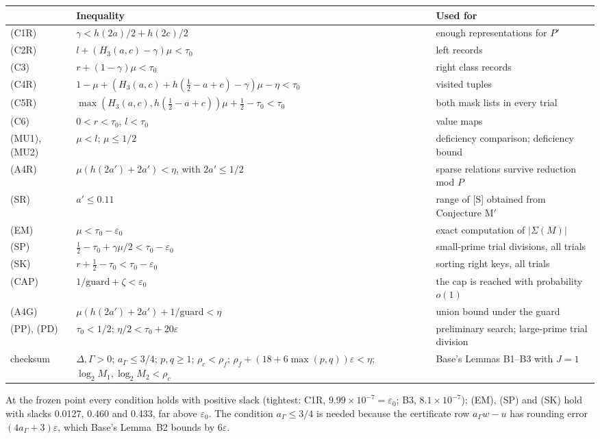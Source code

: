 \documentclass[11pt]{article}
\newcommand{\eps}{\varepsilon}
\theoremstyle{plain}
\begin{document}
\begin{center}
\small
\begin{tabularx}{\linewidth}{>{\raggedright\arraybackslash}p{1.4cm} L >{\raggedright\arraybackslash}p{4.4cm}}
\toprule
& Inequality & Used for \\
\midrule
(C1R) & $\gamma < h(2a)/2 + h(2c)/2$ & enough representations for $P'$ \\
(C2R) & $l + (H_3(a,c) - \gamma)\mu < \tau_0$ & left records \\
(C3) & $r + (1-\gamma)\mu < \tau_0$ & right class records \\
(C4R) & $1 - \mu + (H_3(a,c) + h(\tfrac12 - a + c) - \gamma)\mu - \eta < \tau_0$ & visited tuples \\
(C5R) & $\max(H_3(a,c), h(\tfrac12 - a + c))\mu + \tfrac12 - \tau_0 < \tau_0$ & both mask lists in every trial \\
(C6) & $0 < r < \tau_0$, $l < \tau_0$ & value maps \\
(MU1), (MU2) & $\mu < l$; $\mu \le 1/2$ & deficiency comparison; deficiency bound \\
(A4R) & $\mu(h(2a') + 2a') < \eta$, with $2a' \le 1/2$ & sparse relations survive reduction mod $P$ \\
(SR) & $a' \le 0.11$ & range of [S] obtained from Conjecture M$'$ \\
(EM) & $\mu < \tau_0 - \eps_0$ & exact computation of $|\Sigma(M)|$ \\
(SP) & $\tfrac12 - \tau_0 + \gamma\mu/2 < \tau_0 - \eps_0$ & small-prime trial divisions, all trials \\
(SK) & $r + \tfrac12 - \tau_0 < \tau_0 - \eps_0$ & sorting right keys, all trials \\
(CAP) & $1/\mathrm{guard} + \zeta < \eps_0$ & the cap is reached with probability $o(1)$ \\
(A4G) & $\mu(h(2a') + 2a') + 1/\mathrm{guard} < \eta$ & union bound under the guard \\
(PP), (PD) & $\tau_0 < 1/2$; $\eta/2 < \tau_0 + 20\eps$ & preliminary search; large-prime trial division \\
checksum & $\Delta, \Gamma > 0$; $a_\Gamma \le 3/4$; $p, q \ge 1$; $\rho_c < \rho_f$; $\rho_f + (18 + 6\max(p,q))\eps < \eta$; $\log_2 M_1, \log_2 M_2 < \rho_c$ & Base's Lemmas B1--B3 with $J = 1$ \\
\bottomrule
\end{tabularx}
\end{center}

At the frozen point every condition holds with positive slack (tightest: C1R, $9.99\times10^{-7} = \eps_0$; B3, $8.1\times10^{-7}$); (EM), (SP) and (SK) hold with slacks 0.0127, 0.460 and 0.433, far above $\eps_0$. The condition $a_\Gamma \le 3/4$ is needed because the certificate row $a_\Gamma w - u$ has rounding error $(4a_\Gamma + 3)\eps$, which Base's Lemma~B2 bounds by $6\eps$.
\end{document}
